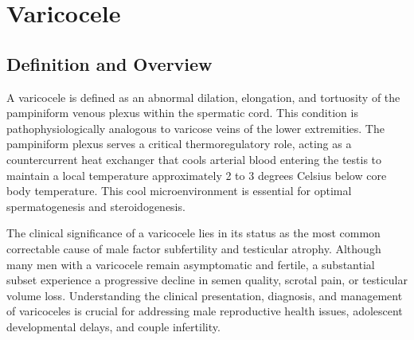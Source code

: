 \chapter{Varicocele}

\section*{Definition and Overview}
A varicocele is defined as an abnormal dilation, elongation, and tortuosity of the pampiniform venous plexus within the spermatic cord. This condition is pathophysiologically analogous to varicose veins of the lower extremities. The pampiniform plexus serves a critical thermoregulatory role, acting as a countercurrent heat exchanger that cools arterial blood entering the testis to maintain a local temperature approximately 2 to 3 degrees Celsius below core body temperature. This cool microenvironment is essential for optimal spermatogenesis and steroidogenesis.

The clinical significance of a varicocele lies in its status as the most common correctable cause of male factor subfertility and testicular atrophy. Although many men with a varicocele remain asymptomatic and fertile, a substantial subset experience a progressive decline in semen quality, scrotal pain, or testicular volume loss. Understanding the clinical presentation, diagnosis, and management of varicoceles is crucial for addressing male reproductive health issues, adolescent developmental delays, and couple infertility.

